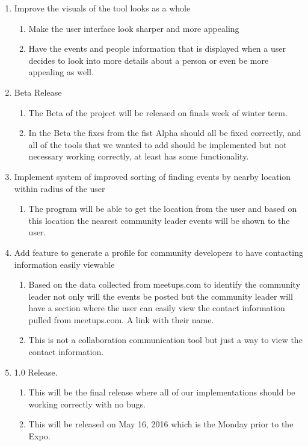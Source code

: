 \documentclass[draftclsnofoot,10pt,onecolumn]{IEEEtran} %
\begin{document}
\begin{enumerate}
\item Improve the visuals of the tool looks as a whole \\
\begin{enumerate}
\item Make the user interface look sharper and more appealing
\item Have the events and people information that is displayed when a user decides to look into more details about a person or even be more appealing as well. \\
\end{enumerate}

\item Beta Release \\
\begin{enumerate}
\item The Beta of the project will be released on finals week of winter term.
\item In the Beta the fixes from the fist Alpha should all be fixed correctly, and all of the tools that we wanted to add should be implemented but not necessary working correctly, at least has some functionality. \\
\end{enumerate}

\item Implement system of improved sorting of finding events by nearby location within radius of the user \\
\begin{enumerate}
\item The program will be able to get the location from the user and based on this location the nearest community leader events will be shown to the user. \\
\end{enumerate}

\item Add feature to generate a profile for community developers to have contacting information easily viewable \\
\begin{enumerate}
\item Based on the data collected from meetups.com to identify the community leader not only will the events be posted but the community leader will have a section where the user can easily view the contact information pulled from meetups.com. A link with their name.
\item This is not a collaboration communication tool but just a way to view the contact information. \\
\end{enumerate}

\item 1.0 Release. \\
\begin{enumerate}
\item This will be the final release where all of our implementations should be working correctly with no bugs.
\item This will be released on May 16, 2016 which is the Monday prior to the Expo.
\end{enumerate}
\end{enumerate}
\end{document}
